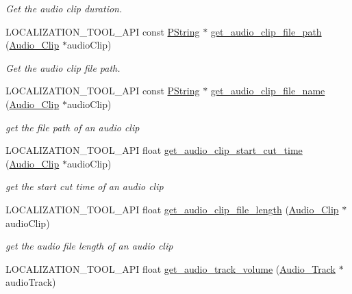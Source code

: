 \begin{DoxyCompactItemize}
\begin{DoxyCompactList}\small\item\em Get the audio clip duration. \end{DoxyCompactList}\item 
L\+O\+C\+A\+L\+I\+Z\+A\+T\+I\+O\+N\+\_\+\+T\+O\+O\+L\+\_\+\+A\+PI const \mbox{\hyperlink{classprz_1_1_p_string}{P\+String}} $\ast$ \mbox{\hyperlink{namespaceprz_a1e56bb34b7529aa4bebbc720221ab7c8}{get\+\_\+audio\+\_\+clip\+\_\+file\+\_\+path}} (\mbox{\hyperlink{classprz_1_1_audio___clip}{Audio\+\_\+\+Clip}} $\ast$audio\+Clip)
\begin{DoxyCompactList}\small\item\em Get the audio clip file path. \end{DoxyCompactList}\item 
L\+O\+C\+A\+L\+I\+Z\+A\+T\+I\+O\+N\+\_\+\+T\+O\+O\+L\+\_\+\+A\+PI const \mbox{\hyperlink{classprz_1_1_p_string}{P\+String}} $\ast$ \mbox{\hyperlink{namespaceprz_a1e806a9ab1fe1af94256d0e0efccd999}{get\+\_\+audio\+\_\+clip\+\_\+file\+\_\+name}} (\mbox{\hyperlink{classprz_1_1_audio___clip}{Audio\+\_\+\+Clip}} $\ast$audio\+Clip)
\begin{DoxyCompactList}\small\item\em get the file path of an audio clip \end{DoxyCompactList}\item 
L\+O\+C\+A\+L\+I\+Z\+A\+T\+I\+O\+N\+\_\+\+T\+O\+O\+L\+\_\+\+A\+PI float \mbox{\hyperlink{namespaceprz_a80b9123c3664ba7b0e6bcceed4362dfc}{get\+\_\+audio\+\_\+clip\+\_\+start\+\_\+cut\+\_\+time}} (\mbox{\hyperlink{classprz_1_1_audio___clip}{Audio\+\_\+\+Clip}} $\ast$audio\+Clip)
\begin{DoxyCompactList}\small\item\em get the start cut time of an audio clip \end{DoxyCompactList}\item 
L\+O\+C\+A\+L\+I\+Z\+A\+T\+I\+O\+N\+\_\+\+T\+O\+O\+L\+\_\+\+A\+PI float \mbox{\hyperlink{namespaceprz_aa29f4f6bfb3146f21ba0e8e9a446fc11}{get\+\_\+audio\+\_\+clip\+\_\+file\+\_\+length}} (\mbox{\hyperlink{classprz_1_1_audio___clip}{Audio\+\_\+\+Clip}} $\ast$audio\+Clip)
\begin{DoxyCompactList}\small\item\em get the audio file length of an audio clip \end{DoxyCompactList}\item 
L\+O\+C\+A\+L\+I\+Z\+A\+T\+I\+O\+N\+\_\+\+T\+O\+O\+L\+\_\+\+A\+PI float \mbox{\hyperlink{namespaceprz_ac010ab2ba32ea1a6777bdf865aa2dcd5}{get\+\_\+audio\+\_\+track\+\_\+volume}} (\mbox{\hyperlink{classprz_1_1_audio___track}{Audio\+\_\+\+Track}} $\ast$audio\+Track)

\end{DoxyCompactItemize}
